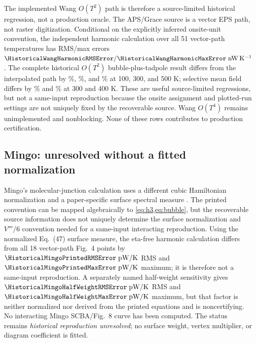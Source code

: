 \documentclass[11pt]{article}
\renewcommand{\_}{\OriginalTextUnderscore\allowbreak}
\begin{document}
The implemented Wang \(O(T^2)\) path is therefore a source-limited
historical regression, not a production oracle. The APS/Grace source is a
vector EPS path, not raster digitization. Conditional on the explicitly
inferred onsite-unit convention, the independent harmonic calculation over
all 51 vector-path temperatures has RMS/max errors
\(\HistoricalWangHarmonicRMSError/\HistoricalWangHarmonicMaxError\;\mathrm{nW\,K^{-1}}\). The complete historical
\(O(T^2)\) bubble-plus-tadpole result differs from the interpolated path by
\HistoricalWangBornErrorAtOneHundredK\%, \HistoricalWangBornErrorAtThreeHundredK\%, and
\HistoricalWangBornErrorAtFiveHundredK\% at 100, 300, and 500 K; selective mean field
differs by \HistoricalWangMeanFieldErrorAtThreeHundredK\% and
\HistoricalWangMeanFieldErrorAtFourHundredK\% at 300 and 400 K. These are useful
source-limited regressions, but not a same-input reproduction because the
onsite assignment and plotted-run settings are not uniquely fixed by the
recoverable source. Wang \(O(T^4)\) remains unimplemented and nonblocking.
None of these rows contributes to production certification.

\subsection{Mingo: unresolved without a fitted normalization}

Mingo's molecular-junction calculation uses a different cubic Hamiltonian
normalization and a paper-specific surface spectral measure
\cite{mingo2006}. The printed convention can be mapped algebraically to
\cref{eq:h3,eq:bubble}, but the recoverable source information does not
uniquely determine the surface normalization and \(V'''/6\) convention
needed for a same-input interacting reproduction. Using the normalized
Eq.~(47) surface measure, the eta-free harmonic calculation differs from all
18 vector-path Fig.~4 points by \(\HistoricalMingoPrintedRMSError\;\mathrm{pW/K}\) RMS and
\(\HistoricalMingoPrintedMaxError\;\mathrm{pW/K}\) maximum; it is therefore not a same-input
reproduction. A separately named half-weight sensitivity gives
\(\HistoricalMingoHalfWeightRMSError\;\mathrm{pW/K}\) RMS and
\(\HistoricalMingoHalfWeightMaxError\;\mathrm{pW/K}\) maximum, but
that factor is neither normalized nor derived from the printed equations and
is noncertifying. No interacting Mingo SCBA/Fig.~8 curve has been computed.
The status remains \emph{historical reproduction unresolved}; no surface
weight, vertex multiplier, or diagram coefficient is fitted.
\end{document}
